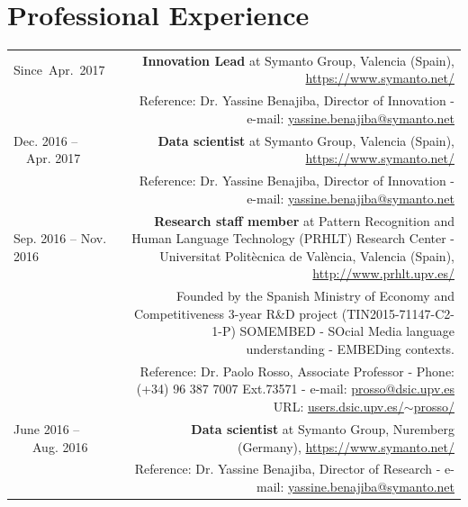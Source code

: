 \documentclass[10pt]{article}
\begin{document}
\section*{Professional Experience}
\begin{tabular}{L!{\VRule}R}

Since~Apr.~2017 &{\textbf{Innovation Lead} at Symanto Group, Valencia (Spain), \url{https://www.symanto.net/}}\\
&\scriptsize{Reference: Dr. Yassine Benajiba, Director of Innovation - e-mail: \href{mailto:yassine.benajiba@symanto.net}{yassine.benajiba@symanto.net}}\\

Dec. 2016 -- ~~Apr. 2017 ~~&{\textbf{Data scientist} at Symanto Group, Valencia (Spain), \url{https://www.symanto.net/}}\\
&\scriptsize{Reference: Dr. Yassine Benajiba, Director of Innovation - e-mail: \href{mailto:yassine.benajiba@symanto.net}{yassine.benajiba@symanto.net}}\\

Sep. 2016 -- Nov. 2016 ~~&{\textbf{Research staff member} at Pattern Recognition and Human Language Technology (PRHLT) Research Center - Universitat Polit{\`e}cnica de Val{\`e}ncia, Valencia (Spain),
\url{http://www.prhlt.upv.es/}}\\
&\scriptsize{Founded by the Spanish Ministry of Economy and Competitiveness 3-year R\&D project (TIN2015-71147-C2-1-P) SOMEMBED - SOcial Media language understanding - EMBEDing contexts.}\\
&\scriptsize{Reference: Dr. Paolo Rosso, Associate Professor - Phone: (+34) 96 387 7007 Ext.73571 - e-mail: \href{mailto:prosso@dsic.upv.es}{prosso@dsic.upv.es} ~~~~~~~ URL: \href{http://users.dsic.upv.es/~prosso/}{users.dsic.upv.es/$\sim$prosso/}}\\


June 2016 -- ~~~Aug. 2016 ~~&{\textbf{Data scientist} at Symanto Group, Nuremberg (Germany), \url{https://www.symanto.net/}}\\
&\scriptsize{Reference: Dr. Yassine Benajiba, Director of Research - e-mail: \href{mailto:yassine.benajiba@symanto.net}{yassine.benajiba@symanto.net}}\\


\end{tabular}
\end{document}
